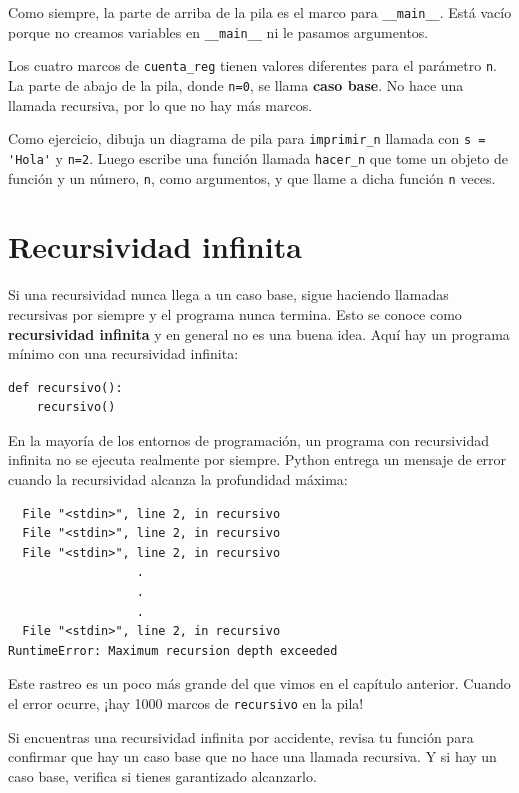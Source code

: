 \documentclass[10pt]{book}
\begin{document}
Como siempre, la parte de arriba de la pila es el marco para \verb"__main__".
Está vacío porque no creamos variables en
\verb"__main__" ni le pasamos argumentos.

Los cuatro marcos de {\tt cuenta\_reg} tienen valores diferentes para el
parámetro {\tt n}.  La parte de abajo de la pila, donde {\tt n=0}, se
llama {\bf caso base}.  No hace una llamada recursiva, por lo que
no hay más marcos.

Como ejercicio, dibuja un diagrama de pila para \verb"imprimir_n" llamada con
\verb"s = 'Hola'" y {\tt n=2}.
Luego escribe una función llamada \verb"hacer_n" que tome un objeto de
función y un número, {\tt n}, como argumentos, y que llame
a dicha función {\tt n} veces.


\section{Recursividad infinita}

Si una recursividad nunca llega a un caso base, sigue haciendo
llamadas recursivas por siempre y el programa nunca termina.  Esto se
conoce como {\bf recursividad infinita} y en general no es
una buena idea.  Aquí hay un programa mínimo con una recursividad infinita:

\begin{verbatim}
def recursivo():
    recursivo()
\end{verbatim}
%
En la mayoría de los entornos de programación, un programa con recursividad infinita
no se ejecuta realmente por siempre.  Python entrega un
mensaje de error cuando la recursividad alcanza la profundidad máxima:

\begin{verbatim}
  File "<stdin>", line 2, in recursivo
  File "<stdin>", line 2, in recursivo
  File "<stdin>", line 2, in recursivo
                  .
                  .
                  .
  File "<stdin>", line 2, in recursivo
RuntimeError: Maximum recursion depth exceeded
\end{verbatim}
%
Este rastreo es un poco más grande del que vimos en el
capítulo anterior.  Cuando el error ocurre, ¡hay 1000
marcos de {\tt recursivo} en la pila!

Si encuentras una recursividad infinita por accidente, revisa
tu función para confirmar que hay un caso base que no
hace una llamada recursiva.  Y si hay un caso base, verifica si
tienes garantizado alcanzarlo.
\end{document}
